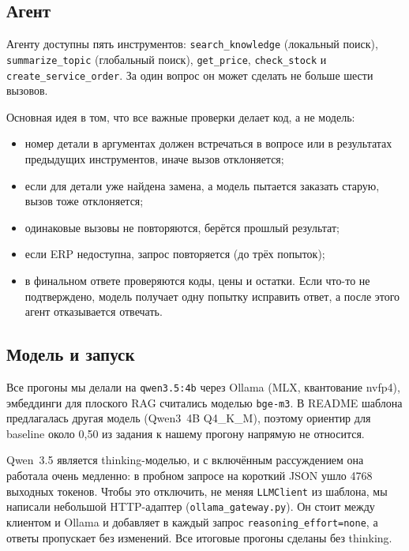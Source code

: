 \documentclass[a4paper,12pt]{article}
\newcommand{\code}[1]{\texttt{#1}}
\begin{document}
\subsection{Агент}

Агенту доступны пять инструментов: \code{search\_knowledge} (локальный поиск), \code{summarize\_topic} (глобальный поиск), \code{get\_price}, \code{check\_stock} и \code{create\_service\_order}. За один вопрос он может сделать не больше шести вызовов.

Основная идея в том, что все важные проверки делает код, а не модель:
\begin{itemize}
\item номер детали в аргументах должен встречаться в вопросе или в результатах предыдущих инструментов, иначе вызов отклоняется;
\item если для детали уже найдена замена, а модель пытается заказать старую, вызов тоже отклоняется;
\item одинаковые вызовы не повторяются, берётся прошлый результат;
\item если ERP недоступна, запрос повторяется (до трёх попыток);
\item в финальном ответе проверяются коды, цены и остатки. Если что-то не подтверждено, модель получает одну попытку исправить ответ, а после этого агент отказывается отвечать.
\end{itemize}

\subsection{Модель и запуск}

Все прогоны мы делали на \code{qwen3.5:4b} через Ollama (MLX, квантование nvfp4), эмбеддинги для плоского RAG считались моделью \code{bge-m3}. В README шаблона предлагалась другая модель (Qwen3~4B Q4\_K\_M), поэтому ориентир для baseline около 0,50 из задания к нашему прогону напрямую не относится.

Qwen~3.5 является thinking-моделью, и с включённым рассуждением она работала очень медленно: в пробном запросе на короткий JSON ушло 4768 выходных токенов. Чтобы это отключить, не меняя \code{LLMClient} из шаблона, мы написали небольшой HTTP-адаптер (\code{ollama\_gateway.py}). Он стоит между клиентом и Ollama и добавляет в каждый запрос \code{reasoning\_effort=none}, а ответы пропускает без изменений. Все итоговые прогоны сделаны без thinking.

\end{document}
